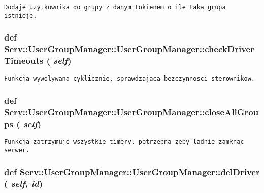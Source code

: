 \footnotesize\begin{verbatim}Dodaje uzytkownika do grupy z danym tokienem o ile taka grupa istnieje.\end{verbatim}
\normalsize
 \hypertarget{class_serv_1_1_user_group_manager_1_1_user_group_manager_d856b62d77f4d4de9f710c973e0684ff}{
\subsubsection[{checkDriverTimeouts}]{\setlength{\rightskip}{0pt plus 5cm}def Serv::UserGroupManager::UserGroupManager::checkDriverTimeouts ( {\em self})}}
\label{class_serv_1_1_user_group_manager_1_1_user_group_manager_d856b62d77f4d4de9f710c973e0684ff}




\footnotesize\begin{verbatim}Funkcja wywolywana cyklicznie, sprawdzajaca bezczynnosci sterownikow.\end{verbatim}
\normalsize
 \hypertarget{class_serv_1_1_user_group_manager_1_1_user_group_manager_27d3337033ac8ff991c966de020f44bc}{
\subsubsection[{closeAllGroups}]{\setlength{\rightskip}{0pt plus 5cm}def Serv::UserGroupManager::UserGroupManager::closeAllGroups ( {\em self})}}
\label{class_serv_1_1_user_group_manager_1_1_user_group_manager_27d3337033ac8ff991c966de020f44bc}




\footnotesize\begin{verbatim}Funkcja zatrzymuje wszystkie timery, potrzebna zeby ladnie zamknac serwer.\end{verbatim}
\normalsize
 \hypertarget{class_serv_1_1_user_group_manager_1_1_user_group_manager_918bada5214630320d1650bef41f4889}{
\subsubsection[{delDriver}]{\setlength{\rightskip}{0pt plus 5cm}def Serv::UserGroupManager::UserGroupManager::delDriver ( {\em self}, \/   {\em id})}}
\label{class_serv_1_1_user_group_manager_1_1_user_group_manager_918bada5214630320d1650bef41f4889}




